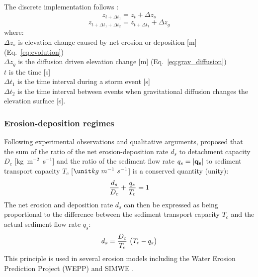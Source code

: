 \documentclass[gmd, manuscript]{copernicus}
\begin{document}
\noindent
The discrete implementation follows \cite{Thaxton2004}:
\begin{equation}
\label{eq:evolution_disc1} 
z_{t+ \Delta t_1} = z_t + \Delta z_s  
\end{equation}
\begin{equation}
\label{eq:evolution_disc2} 
z_{t+\Delta t_1+\Delta t_2} = z_{t+\Delta t_1} + \Delta z_g 
\end{equation}
{\small
where: \\
\noindent
\hspace*{0.5em} $\Delta z_s$ is elevation change caused by net erosion or deposition
[\unit{m}] (Eq.~\ref{eq:evolution})\\
\hspace*{0.5em} $\Delta z_g$ is the diffusion driven elevation change
[\unit{m}] (Eq.~\ref{eq:grav_diffusion})\\
\hspace*{0.5em} $t$ is the time [\unit{s}]\\
\hspace*{0.5em} $\Delta t_1$ is the time interval during a storm event [\unit{s}]\\
\hspace*{0.5em} $\Delta t_2$ is the time interval between events
when gravitational diffusion changes the elevation surface [\unit{s}].\\
}

\subsubsection{Erosion-deposition regimes}

Following experimental observations and qualitative arguments, 
\cite{Foster1977} proposed that the sum of 
the ratio of the net erosion-deposition rate $d_s$ 
to detachment capacity  $D_c$  [\unit{kg~m}$^{-2}$~\unit{s}$^{-1}$] 
and the ratio of the sediment flow rate $q_s = |{\bf q_s}|$ 
to sediment transport capacity $T_c$ [$\unit kg~m^{-1}~s^{-1}$]
is a conserved quantity (unity):
\begin{equation}
\label{eq:foster_law}
{d_s \over D_c} + {q_s \over T_c} = 1
\end{equation}
The net erosion and deposition rate $d_s$ can then be expressed 
as being proportional to the difference between
the sediment transport capacity $T_c$ 
and the actual sediment flow rate $q_s$:
\begin{equation}
\label{eq:sigma}
d_s = {D_c \over T_c}~\bigl( T_c - q_s\bigr)
\end{equation}
\noindent
This principle is used in several erosion models 
including the Water Erosion Prediction Project (WEPP) \citep{Flanagan2013} 
and SIMWE \citep{Mitas1998}. 
\end{document}
